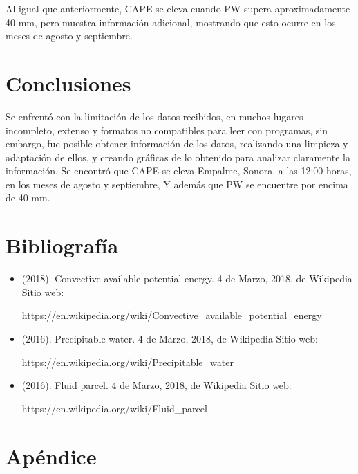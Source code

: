 \documentclass[a4paper]{article}
\begin{document}
Al igual que anteriormente, CAPE se eleva cuando PW supera aproximadamente 40 mm, pero muestra información adicional, mostrando que esto ocurre en los meses de agosto y septiembre.

\section{Conclusiones}

Se enfrentó con la limitación de los datos recibidos, en muchos lugares incompleto, extenso y formatos no compatibles para leer con programas, sin embargo, fue posible obtener información de los datos, realizando una limpieza y adaptación de ellos, y creando gráficas de lo obtenido para analizar claramente la información. Se encontró que CAPE se eleva Empalme, Sonora, a las 12:00 horas, en los meses de agosto y septiembre, Y además que PW se encuentre por encima de 40 mm.

\section{Bibliografía}

\begin{itemize}
\item (2018). Convective available potential energy. 4 de Marzo, 2018, de Wikipedia Sitio web: 

https://en.wikipedia.org/wiki/Convective\_available\_potential\_energy

\item (2016). Precipitable water. 4 de Marzo, 2018, de Wikipedia Sitio web: 

https://en.wikipedia.org/wiki/Precipitable\_water

\item (2016). Fluid parcel. 4 de Marzo, 2018, de Wikipedia Sitio web: 

https://en.wikipedia.org/wiki/Fluid\_parcel
\end{itemize}



\section{Apéndice}
\end{document}
